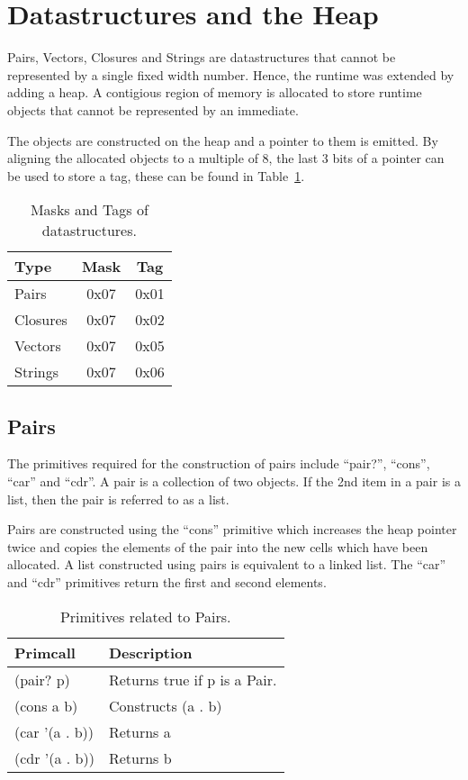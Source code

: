 \documentclass{article}
\begin{document}
\section{Datastructures and the Heap}

Pairs, Vectors, Closures and Strings are datastructures that cannot be represented by a single fixed width number. Hence, the runtime was extended by adding a heap. A contigious region of memory is allocated to store runtime objects that cannot be represented by an immediate. 

The objects are constructed on the heap and a pointer to them is emitted. By aligning the allocated objects to a multiple of 8, the last 3 bits of a pointer can be used to store a tag, these can be found in Table~\ref{tab:datastructures}.

\begin{table}[ht]
  \centering
\begin{tabular}{ l c c }
  \toprule
  Type & Mask & Tag  \\ \hline
  \midrule
  Pairs  & 0x07 & 0x01 \\
  Closures & 0x07 & 0x02 \\
  Vectors & 0x07 & 0x05 \\
  Strings & 0x07 & 0x06 \\
  \bottomrule
\end{tabular}
\caption{Masks and Tags of datastructures.} \label{tab:datastructures}
\end{table}

\subsection{Pairs}

The primitives required for the construction of pairs include ``pair?'', ``cons'', ``car'' and ``cdr''. A pair is a collection of two objects. If the 2nd item in a pair is a list, then the pair is referred to as a list.

Pairs are constructed using the ``cons'' primitive which increases the heap pointer twice and copies the elements of the pair into the new cells which have been allocated. A list constructed using pairs is equivalent to a linked list. The ``car'' and ``cdr'' primitives return the first and second elements.

\begin{table}[ht]
  \centering
\begin{tabular}{ l l }
  \toprule
  Primcall & Description \\ \hline
  \midrule
  (pair? p) & Returns true if p is a Pair.   \\
  (cons a b) & Constructs (a . b)  \\
  (car '(a . b)) & Returns a \\
  (cdr '(a . b)) & Returns b \\
  \bottomrule
\end{tabular}
\caption{Primitives related to Pairs.} \label{tab:pairs}
\end{table}
\end{document}
